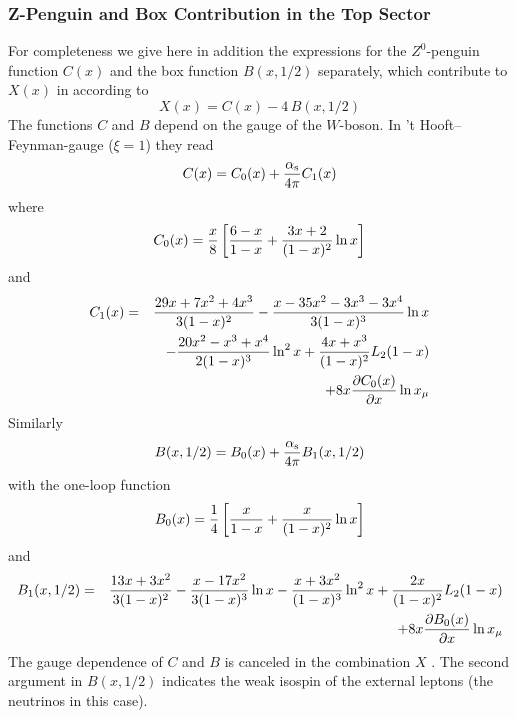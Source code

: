 \subsubsection{Z-Penguin and Box Contribution in the Top Sector}
               \label{sec:HeffRareKB:kpnn:Zptop}
For completeness we give here in addition the expressions for the
$Z^0$-penguin function $C(x)$ and the box function $B(x,1/2)$ separately,
which contribute to $X(x)$ in  according to
\begin{equation}\label{xc4b} X(x)=C(x) - 4 \, B(x,1/2)  \end{equation}
The functions $C$ and $B$ depend on the gauge of the $W$-boson.
In 't Hooft--Feynman-gauge ($\xi=1$) they read
\begin{equation}\label{cx01} C(x)=C_0(x)+{\alpha_{\rm s}\over 4\pi} C_1(x)   \end{equation}
where \cite{inamilim:81}
\begin{equation}\label{cx0} C_0(x) = {x \over 8} \left[{6-x\over 1-x} +
   {3x+2\over (1-x)^2} \ln x\right]   \end{equation}
and \cite{buchallaburas:93a}
\begin{eqnarray}\label{cx1}
C_1(x) &=& {29x + 7x^2+4x^3 \over 3(1-x)^2}
           - {x - 35x^2 -3 x^3 -3 x^4\over 3(1-x)^3} \ln x\nonumber\\
       & &- {20x^2 - x^3+x^4\over 2(1-x)^3} \ln^2 x
           + {4x+x^3\over (1-x)^2} L_2 (1-x)\nonumber\\
       & &+ 8x {\partial C_0(x)\over \partial x} \ln x_\mu
\end{eqnarray}
Similarly
\begin{equation}\label{bx01p}
B(x, 1/2) = B_0(x) + {\alpha_{\rm s}\over 4\pi} B_1 (x, 1/2)   \end{equation}
with the one-loop function \cite{inamilim:81}
\begin{equation}\label{bx0}
B_0(x) = {1\over 4}\left[{x\over 1-x} + {x\over (1-x)^2} \ln x\right] \end{equation}
and \cite{buchallaburas:93b}
\begin{eqnarray}\label{bx1p}
B_1(x, 1/2)&=&{13x + 3x^2\over 3(1-x)^2} -
{x-17x^2\over 3(1-x)^3} \ln x
-  {x+3x^2\over (1-x)^3}\ln^2x + {2x\over(1-x)^2} L_2(1-x)\nonumber\\
& &+ 8x {\partial B_0(x)\over \partial x} \ln x_\mu
\end{eqnarray}
The gauge dependence of $C$ and $B$ is canceled in the
combination $X$ . The second argument in $B(x,1/2)$ indicates the
weak isospin of the external leptons (the neutrinos in this case).

